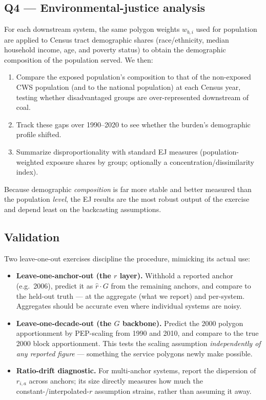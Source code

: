 \documentclass[11pt]{article}
\newcommand{\geopop}{\ensuremath{G}}
\newcommand{\ratio}{\ensuremath{r}}
\begin{document}
\subsection{Q4 --- Environmental-justice analysis}
\label{sec:ej}
For each downstream system, the same polygon weights $w_{b,i}$ used for population are
applied to Census tract demographic shares (race/ethnicity, median household income,
age, and poverty status) to obtain the demographic composition of the population
served. We then:
\begin{enumerate}[leftmargin=2em]
  \item Compare the exposed population's composition to that of the non-exposed CWS
    population (and to the national population) at each Census year, testing whether
    disadvantaged groups are over-represented downstream of coal.
  \item Track these gaps over 1990--2020 to see whether the burden's demographic
    profile shifted.
  \item Summarize disproportionality with standard EJ measures (population-weighted
    exposure shares by group; optionally a concentration/dissimilarity index).
\end{enumerate}
Because demographic \emph{composition} is far more stable and better measured than the
population \emph{level}, the EJ results are the most robust output of the exercise and
depend least on the backcasting assumptions.

\subsection{Validation}
\label{sec:validation}
Two leave-one-out exercises discipline the procedure, mimicking its actual use:
\begin{itemize}[leftmargin=2em]
  \item \textbf{Leave-one-anchor-out (the $\ratio$ layer).} Withhold a reported anchor
    (e.g.\ 2006), predict it as $\hat{\ratio}\cdot\geopop$ from the remaining anchors,
    and compare to the held-out truth --- at the aggregate (what we report) and
    per-system. Aggregates should be accurate even where individual systems are noisy.
  \item \textbf{Leave-one-decade-out (the $\geopop$ backbone).} Predict the 2000
    polygon apportionment by PEP-scaling from 1990 and 2010, and compare to the true
    2000 block apportionment. This tests the scaling assumption \emph{independently of
    any reported figure} --- something the service polygons newly make possible.
  \item \textbf{Ratio-drift diagnostic.} For multi-anchor systems, report the
    dispersion of $\ratio_{i,a}$ across anchors; its size directly measures how much
    the constant-/interpolated-$\ratio$ assumption strains, rather than assuming it
    away.
\end{itemize}
\end{document}
